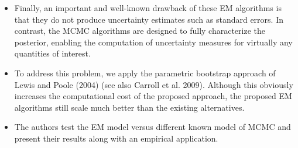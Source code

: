 \documentclass[a4paper,12pt]{article}
\begin{document}
\begin{enumerate}
\begin{itemize}
\item Finally, an important and well-known drawback of these EM algorithms is that they do not produce uncertainty estimates such as standard errors. In contrast, the MCMC algorithms are designed to fully characterize the posterior, enabling the computation of uncertainty measures for virtually any quantities of interest. 
\item To address this problem, we apply the parametric bootstrap approach of Lewis and Poole (2004) (see also Carroll et al. 2009). Although this obviously increases the computational cost of the proposed approach, the proposed EM algorithms still scale much better than the existing alternatives. 
\item The authors test the EM model versus different known model of MCMC and present their results along with an empirical application. 
\end{itemize}


\newpage





\end{enumerate}
\end{document}
